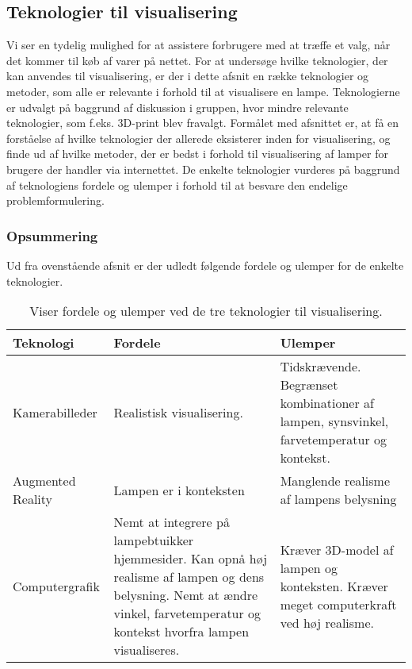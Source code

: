 \subsection{Teknologier til visualisering}
Vi ser en tydelig mulighed for at assistere forbrugere med at træffe et valg, når det kommer til køb af varer på nettet. For at undersøge hvilke teknologier, der kan anvendes til visualisering, er der i dette afsnit en række teknologier og metoder, som alle er relevante i forhold til at visualisere en lampe. Teknologierne er udvalgt på baggrund af diskussion i gruppen, hvor mindre relevante teknologier, som f.eks. 3D-print blev fravalgt. Formålet med afsnittet er, at få en forståelse af hvilke teknologier der allerede eksisterer inden for visualisering, og finde ud af hvilke metoder, der er bedst i forhold til visualisering af lamper for brugere der handler via internettet. De enkelte teknologier vurderes på baggrund af teknologiens fordele og ulemper i forhold til at besvare den endelige problemformulering.







\subsubsection*{Opsummering}
Ud fra ovenstående afsnit er der udledt følgende fordele og ulemper for de enkelte teknologier.
\begin{table}[h!]
  \centering
  
\center
    \begin{tabular}{ | p{3cm} | p{5cm} | p{5cm} |}
    
    \hline
    Teknologi & Fordele & Ulemper \\ \hline
    Kamerabilleder & Realistisk visualisering. & Tidskrævende. Begrænset kombinationer af lampen, synsvinkel, farvetemperatur og kontekst. \\ \hline
    Augmented Reality & Lampen er i konteksten & Manglende realisme af lampens belysning \\ \hline
   Computergrafik & Nemt at integrere på lampebtuikker hjemmesider. Kan opnå høj realisme af lampen og dens belysning. \newline Nemt at ændre vinkel, farvetemperatur og kontekst hvorfra lampen visualiseres. & Kræver 3D-model af lampen og konteksten. Kræver meget computerkraft ved høj realisme. \\ \hline
    \end{tabular}
\caption{Viser fordele og ulemper ved de tre teknologier til visualisering.}
\label{tab:fordele_ulemper_teknologier}
\end{table}

